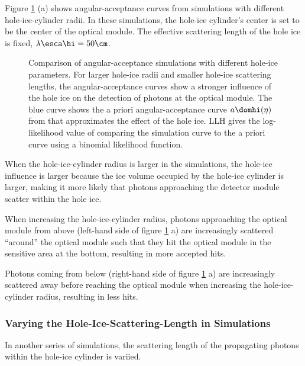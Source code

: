 Figure \ref{fig:neiyi3Al} (a) shows angular-acceptance curves from simulations with different hole-ice-cylinder radii. In these simulations, the hole-ice cylinder's center is set to be the center of the optical module. The effective scattering length of the hole ice is fixed, $\lambda\esca\hi = 50\cm$.

\begin{figure}[htbp]
  \hfill
  \hfill
  \caption{Comparison of angular-acceptance simulations with different hole-ice parameters. For larger hole-ice radii and smaller hole-ice scattering lengths, the angular-acceptance curves show a stronger influence of the hole ice on the detection of photons at the optical module. The blue curve shows the a priori angular-acceptance curve $a\domhi(\eta)$ from \cite{icepaper} that approximates the effect of the hole ice. LLH gives the log-likelihood value of comparing the simulation curve to the a priori curve using a binomial likelihood function.}
  \label{fig:neiyi3Al}
\end{figure}

When the hole-ice-cylinder radius is larger in the simulations, the hole-ice influence is larger because the ice volume occupied by the hole-ice cylinder is larger, making it more likely that photons approaching the detector module scatter within the hole ice.

When increasing the hole-ice-cylinder radius, photons approaching the optical module from above (left-hand side of figure \ref{fig:neiyi3Al} a) are increasingly scattered ``around'' the optical module such that they hit the optical module in the sensitive area at the bottom, resulting in more accepted hits.

Photons coming from below (right-hand side of figure \ref{fig:neiyi3Al} a) are increasingly scattered away before reaching the optical module when increasing the hole-ice-cylinder radius, resulting in less hits.


\subsubsection{Varying the Hole-Ice-Scattering-Length in Simulations}
In another series of simulations, the scattering length of the propagating photons within the hole-ice cylinder is variied.

